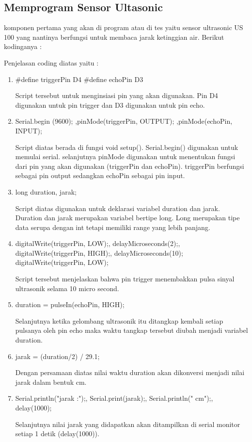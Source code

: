 \subsection{Memprogram Sensor Ultasonic}
\par komponen pertama yang akan di program atau di tes yaitu sensor ultrasonic US 100 yang nantinya berfungsi untuk membaca jarak ketinggian air. Berikut kodinganya :

\par Penjelasan coding diatas yaitu :
\begin{enumerate}
    \item #define triggerPin  D4 #define echoPin D3
\par Script tersebut untuk menginsiasi pin yang akan digunakan. Pin D4 digunakan untuk pin trigger dan D3 digunakan untuk pin echo.
\item Serial.begin (9600); ,pinMode(triggerPin, OUTPUT); ,pinMode(echoPin, INPUT); 
\par Script diatas berada di fungsi void setup(). Serial.begin() digunakan untuk memulai serial. selanjutnya pinMode digunakan untuk menentukan fungsi dari pin yang akan digunakan (triggerPin dan echoPin). triggerPin berfungsi sebagai pin output sedangkan echoPin sebagai pin input.
\item long duration, jarak;
\par Script diatas digunakan untuk deklarasi variabel duration dan jarak. Duration dan jarak merupakan variabel bertipe long. Long merupakan tipe data serupa dengan int tetapi memiliki range yang lebih panjang.
\item   digitalWrite(triggerPin, LOW);,  delayMicroseconds(2);,  digitalWrite(triggerPin, HIGH);,  delayMicroseconds(10);  digitalWrite(triggerPin, LOW);
\par Script tersebut menjelaskan bahwa pin trigger menembakkan pulsa sinyal ultrasonik selama 10 micro second.
\item duration = pulseIn(echoPin, HIGH);
\par Selanjutnya ketika gelombang ultrasonik itu ditangkap kembali setiap pulsanya oleh pin echo maka waktu tangkap tersebut diubah menjadi variabel duration.
\item jarak = (duration/2) / 29.1;
\par Dengan persamaan diatas nilai waktu duration akan dikonversi menjadi nilai jarak dalam bentuk cm.
\item Serial.println("jarak :");,
  Serial.print(jarak);,
  Serial.println(" cm");,
  delay(1000);
\par Selanjutnya nilai jarak yang didapatkan akan ditampilkan di serial monitor setiap 1 detik (delay(1000)).

\end{enumerate}
